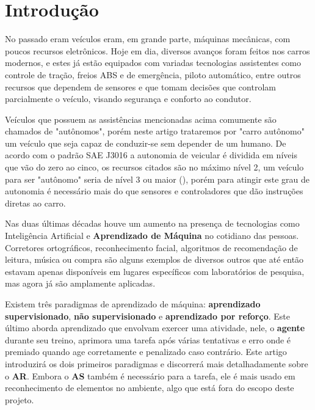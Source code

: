 
\chapter*[Introdução]{Introdução}

No passado eram veículos eram, em grande parte, máquinas mecânicas, com poucos recursos eletrônicos. Hoje em dia, diversos avanços foram feitos nos carros modernos, e estes já estão equipados com variadas tecnologias assistentes como controle de tração, freios ABS e de emergência, piloto automático, entre outros recursos que dependem de sensores e que tomam decisões que controlam parcialmente o veículo, visando segurança e conforto ao condutor. 

Veículos que possuem as assistências mencionadas acima comumente são chamados de "autônomos", porém neste artigo trataremos por "carro autônomo" um veículo que seja capaz de conduzir-se sem depender de um humano. De acordo com o padrão SAE J3016 a autonomia de veicular é dividida em níveis que vão do zero ao cinco, os recursos citados são no máximo nível 2, um veículo para ser "autônomo" seria de nível 3 ou maior (), porém para atingir este grau de autonomia é necessário mais do que sensores e controladores que dão instruções diretas ao carro.

\begin{comment}
Inserir aqui um parágrafo sobre o estado atual dos carros autônomos na indústria e no mercado
\end{comment}

Nas duas últimas décadas houve um aumento na presença de tecnologias como Inteligência Artificial e \textbf{Aprendizado de Máquina} no cotidiano das pessoas. Corretores ortográficos, reconhecimento facial, algoritmos de recomendação de leitura, música ou compra são alguns exemplos de diversos outros que até então estavam apenas disponíveis em lugares específicos com laboratórios de pesquisa, mas agora já são amplamente aplicadas. 

Existem três paradigmas de aprendizado de máquina: \textbf{aprendizado supervisionado}, \textbf{não supervisionado} e \textbf{aprendizado por reforço}. Este último aborda aprendizado que envolvam exercer uma atividade, nele, o \textbf{agente} durante seu treino, aprimora uma tarefa após várias tentativas e erro onde é premiado quando age corretamente e penalizado caso contrário. Este artigo introduzirá os dois primeiros paradigmas e discorrerá mais detalhadamente sobre o \textbf{AR}. Embora o \textbf{AS} também é necessário para a tarefa, ele é mais usado em reconhecimento de elementos no ambiente, algo que está fora do escopo deste projeto.

